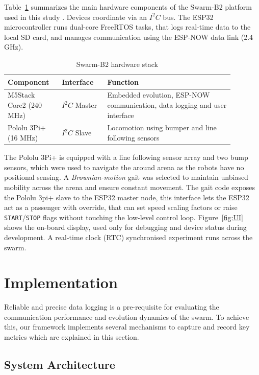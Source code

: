 \documentclass[conference]{IEEEtran}
\begin{document}
Table~\ref{tab:B2-hardware} summarizes the main hardware components of the Swarm-B2 platform used in this study \cite{odowd_university_2025}. Devices coordinate via an $I^2C$ bus. The ESP32 microcontroller runs dual-core FreeRTOS tasks, that logs real-time data to the local SD card, and manages communication using the ESP-NOW data link (2.4 GHz). \\

\begin{table}[h]
  \centering
  \caption{Swarm-B2 hardware stack}
  \label{tab:B2-hardware}
  \begin{tabular}{p{0.20\linewidth} p{0.18\linewidth} p{0.50\linewidth}}
    \toprule
    Component & Interface & Function \\
    \midrule
    M5Stack Core2 (240 MHz) & $I^2C$ Master       & Embedded evolution, ESP-NOW communication, data logging and user interface \\
    Pololu 3Pi+ (16 MHz)    & $I^2C$ Slave        & Locomotion using bumper and line following sensors \\
    \bottomrule
  \end{tabular}
\end{table}

The Pololu 3Pi+ is equipped with a line following sensor array and two bump sensors, which were used to navigate the around arena as the robots have no positional sensing. A \emph{Brownian-motion} gait was selected to maintain unbiased mobility across the arena and ensure constant movement. The gait code exposes the Pololu 3pi+ slave to the ESP32 master node, this interface lets the ESP32 act as a passenger with override, that can set speed scaling factors or raise \texttt{START}/\texttt{STOP} flags without touching the low-level control loop. Figure~\ref{fig:UI} shows the on-board display, used only for debugging and device status during development. A real-time clock (RTC) synchronised experiment runs across the swarm.

\section{Implementation}\label{sec:implementation}
Reliable and precise data logging is a pre-requisite for evaluating the communication performance and evolution dynamics of the swarm. To achieve this, our framework implements several mechanisms to capture and record key metrics which are explained in this section.

\subsection{System Architecture}\label{sec:architecture}
\end{document}
